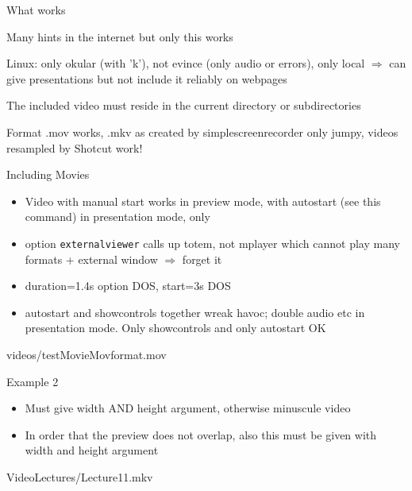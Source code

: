 \documentclass{beamer}
\providecommand{\includemovie}[4]{
  \movie[width=#1, height=#2, showcontrols]
   {\texttt{[image: \#3]}} {#4}
}
\begin{document}
\begin{frame}{What works}
\bi
\item Many hints in the internet but only this works
\item Linux: only okular (with 'k'), not evince (only audio or errors), only local
  $\Rightarrow$  can give presentations 
  but not include it reliably on webpages
\item The included video must reside in the current directory or
  subdirectories 
\item Format .mov works, .mkv as created by simplescreenrecorder only jumpy,
  videos resampled by Shotcut work!

\ei
\end{frame}


\begin{frame}{Including Movies}

\begin{itemize}
\item Video with manual start works in preview mode, with autostart
  (see this command) in presentation mode, only
\item option \texttt{externalviewer} calls up totem, not mplayer which
  cannot play many formats + external window $\Rightarrow$ forget it
\item duration=1.4s option DOS, start=3s DOS
\item autostart and showcontrols together wreak havoc; double audio
  etc in presentation mode. Only showcontrols and only autostart OK
\end{itemize}

  {videos/testMovieMovformat.mov}
\end{frame} 

\begin{frame}{Example 2}

\begin{itemize}
\item Must give width AND height argument, otherwise minuscule video
\item In order that the preview does not overlap, also this must be
  given with width and height argument
\end{itemize}
\includemovie{0.7\textwidth}{0.4\textwidth}
 {VideoLectures/Lecture11_thumbnail.png}{VideoLectures/Lecture11.mkv}
\end{frame} 
\end{document}

